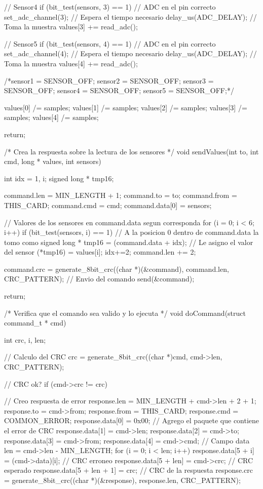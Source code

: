 {\begin{verbatimtab}
{{		// Sensor4
		if (bit_test(sensors, 3) == 1)
		{
			// ADC en el pin correcto
			set_adc_channel(3);
			// Espera el tiempo necesario
			delay_us(ADC_DELAY);
			// Toma la muestra
			values[3] += read_adc();
		}
		
		// Sensor5
		if (bit_test(sensors, 4) == 1)
		{
			// ADC en el pin correcto
			set_adc_channel(4);
			// Espera el tiempo necesario
			delay_us(ADC_DELAY);
			// Toma la muestra
			values[4] += read_adc();
		}
	}
	
	/*sensor1 = SENSOR_OFF;
	sensor2 = SENSOR_OFF;
	sensor3 = SENSOR_OFF;
	sensor4 = SENSOR_OFF;
	sensor5 = SENSOR_OFF;*/
	
	values[0] /= samples;
	values[1] /= samples;
	values[2] /= samples;
	values[3] /= samples;
	values[4] /= samples;
	
	return;
}	

/* Crea la respuesta sobre la lectura de los sensores */
void sendValues(int to, int cmd, long * values, int sensors)
{
	int idx = 1, i;
	signed long * tmp16;
	
	command.len = MIN_LENGTH + 1;
	command.to = to;
	command.from = THIS_CARD;
	command.cmd = cmd;
	command.data[0] = sensors;

	// Valores de los sensores en command.data segun corresponda
	for (i = 0; i < 6; i++)
	{
		if (bit_test(sensors, i) == 1)
		{
			// A la posicion 0 dentro de command.data la tomo como signed long *
			tmp16 = (command.data + idx);
			// Le asigno el valor del sensor
			(*tmp16) = values[i];
			idx+=2;
			command.len += 2;
		}
	}

	command.crc = generate_8bit_crc((char *)(&command), command.len, CRC_PATTERN);
	// Envio del comando
	send(&command);

	return;
}

/* Verifica que el comando sea valido y lo ejecuta */
void doCommand(struct command_t * cmd)
{
	int crc, i, len;
		
	// Calculo del CRC
	crc = generate_8bit_crc((char *)cmd, cmd->len, CRC_PATTERN);
	
	// CRC ok?
	if (cmd->crc != crc)
	{		
		// Creo respuesta de error
		response.len = MIN_LENGTH + cmd->len + 2 + 1;
		response.to = cmd->from;
		response.from = THIS_CARD;
		response.cmd = COMMON_ERROR;
		response.data[0] = 0x00;
		// Agrego el paquete que contiene el error de CRC
		response.data[1] = cmd->len;
		response.data[2] = cmd->to;
		response.data[3] = cmd->from;
		response.data[4] = cmd->cmd;
		// Campo data
		len = cmd->len - MIN_LENGTH;
		for (i = 0; i < len; i++)
			response.data[5 + i] = (cmd->data)[i];
		// CRC erroneo
		response.data[5 + len] = cmd->crc;
		// CRC esperado
		response.data[5 + len + 1] = crc;
		// CRC de la respuesta
		response.crc = generate_8bit_crc((char *)(&response), response.len, CRC_PATTERN);
	
}}
\end{verbatimtab}}
